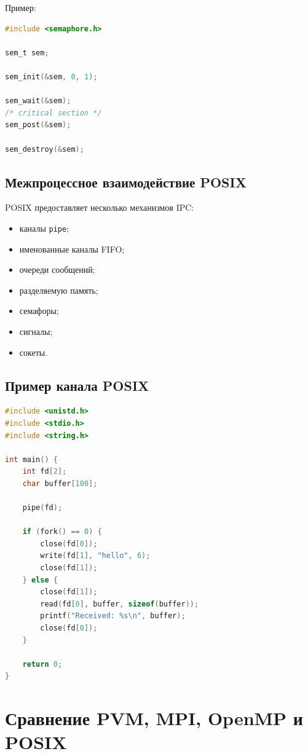 \documentclass[12pt,a4paper]{article}
\begin{document}
Пример:

\begin{lstlisting}[language=C]
#include <semaphore.h>

sem_t sem;

sem_init(&sem, 0, 1);

sem_wait(&sem);
/* critical section */
sem_post(&sem);

sem_destroy(&sem);
\end{lstlisting}

\subsection{Межпроцессное взаимодействие POSIX}

POSIX предоставляет несколько механизмов IPC:
\begin{itemize}
    \item каналы \texttt{pipe};
    \item именованные каналы FIFO;
    \item очереди сообщений;
    \item разделяемую память;
    \item семафоры;
    \item сигналы;
    \item сокеты.
\end{itemize}

\subsection{Пример канала POSIX}

\begin{lstlisting}[language=C]
#include <unistd.h>
#include <stdio.h>
#include <string.h>

int main() {
    int fd[2];
    char buffer[100];

    pipe(fd);

    if (fork() == 0) {
        close(fd[0]);
        write(fd[1], "hello", 6);
        close(fd[1]);
    } else {
        close(fd[1]);
        read(fd[0], buffer, sizeof(buffer));
        printf("Received: %s\n", buffer);
        close(fd[0]);
    }

    return 0;
}
\end{lstlisting}

\section{Сравнение PVM, MPI, OpenMP и POSIX}
\end{document}
